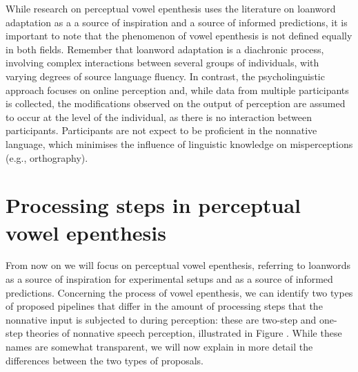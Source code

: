 While research on perceptual vowel epenthesis uses the literature on loanword adaptation as a a source of inspiration and a source of informed predictions, it is important to note that the phenomenon of vowel epenthesis is not defined equally in both fields. Remember that loanword adaptation is a diachronic process, involving complex interactions between several groups of individuals, with varying degrees of source language fluency. 
In contrast, the psycholinguistic approach focuses on online perception and, while data from multiple participants is collected, the modifications observed on the output of perception are assumed to occur at the level of the individual, as there is no interaction between participants. Participants are not expect to be proficient in the nonnative language, which minimises the influence of linguistic knowledge on misperceptions (e.g., orthography). 


\section{Processing steps in perceptual vowel epenthesis}

From now on we will focus on perceptual vowel epenthesis, referring to loanwords as a source of inspiration for experimental setups and as a source of informed predictions. Concerning the process of vowel epenthesis, we can identify two types of proposed pipelines that differ in the amount of processing steps that the nonnative input is subjected to during perception: these are two-step and one-step theories of nonnative speech perception, illustrated in Figure \label{ref:intro_12step}. While these names are somewhat transparent, we will now explain in more detail the differences between the two types of proposals.   

